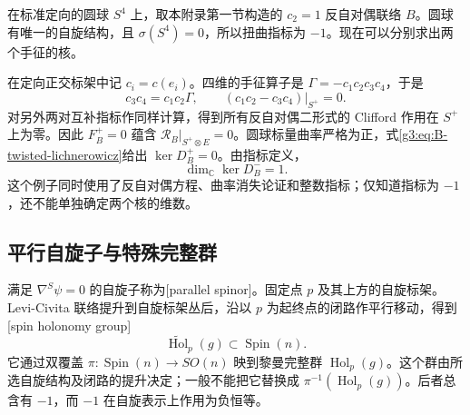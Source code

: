 \begin{example}\label{g3:exm:B-instanton-dirac-kernel}
 在标准定向的圆球 \(S^4\) 上，取本附录第一节构造的 \(c_2=1\) 反自对偶联络 \(B\)。圆球有唯一的自旋结构，且 \(\sigma(S^4)=0\)，所以扭曲指标为 \(-1\)。现在可以分别求出两个手征的核。

 在定向正交标架中记 \(c_i=c(e_i)\)。四维的手征算子是 \(\Gamma=-c_1c_2c_3c_4\)，于是
 \[
  c_3c_4=c_1c_2\Gamma,
  \qquad (c_1c_2-c_3c_4)|_{S^+}=0.
 \]
 对另外两对互补指标作同样计算，得到所有反自对偶二形式的 Clifford 作用在 \(S^+\) 上为零。因此 \(F_B^+=0\) 蕴含 \(\mathcal R_B|_{S^+\otimes E}=0\)。圆球标量曲率严格为正，式\eqref{g3:eq:B-twisted-lichnerowicz}给出 \(\ker D_B^+=0\)。由指标定义，
 \[
  \dim_{\mathbb C}\ker D_B^-=1.
 \]
 这个例子同时使用了反自对偶方程、曲率消失论证和整数指标；仅知道指标为 \(-1\)，还不能单独确定两个核的维数。
\end{example}

\subsection{平行自旋子与特殊完整群}
\label{g3:subsec:B03:02}

满足 \(\nabla^S\psi=0\) 的自旋子称为[parallel spinor]。固定点 \(p\) 及其上方的自旋标架。Levi-Civita 联络提升到自旋标架丛后，沿以 \(p\) 为起终点的闭路作平行移动，得到[spin holonomy group]
\[
 \widetilde{\operatorname{Hol}}_p(g)\subset\operatorname{Spin}(n).
\]
它通过双覆盖 \(\pi:\operatorname{Spin}(n)\to SO(n)\) 映到黎曼完整群 \(\operatorname{Hol}_p(g)\)。这个群由所选自旋结构及闭路的提升决定；一般不能把它替换成 \(\pi^{-1}(\operatorname{Hol}_p(g))\)。后者总含有 \(-1\)，而 \(-1\) 在自旋表示上作用为负恒等。

